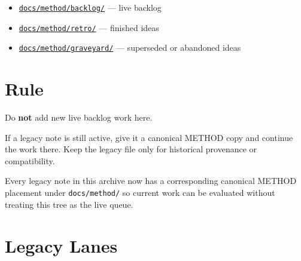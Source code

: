 \begin{itemize}
\tightlist
\item
  \href{https://github.com/flyingrobots/bijou/blob/cbd70612140e7a450d764b3c7be1c6af878b99bc/docs/method/graveyard/method/backlog/README.md}{\texttt{d\allowbreak{}o\allowbreak{}c\allowbreak{}s\allowbreak{}/\allowbreak{}m\allowbreak{}e\allowbreak{}t\allowbreak{}h\allowbreak{}o\allowbreak{}d\allowbreak{}/\allowbreak{}b\allowbreak{}a\allowbreak{}c\allowbreak{}k\allowbreak{}l\allowbreak{}o\allowbreak{}g\allowbreak{}/}} --- live backlog
\item
  \href{https://github.com/flyingrobots/bijou/blob/cbd70612140e7a450d764b3c7be1c6af878b99bc/docs/method/graveyard/method/retro/README.md}{\texttt{d\allowbreak{}o\allowbreak{}c\allowbreak{}s\allowbreak{}/\allowbreak{}m\allowbreak{}e\allowbreak{}t\allowbreak{}h\allowbreak{}o\allowbreak{}d\allowbreak{}/\allowbreak{}r\allowbreak{}e\allowbreak{}t\allowbreak{}r\allowbreak{}o\allowbreak{}/}} --- finished ideas
\item
  \href{https://github.com/flyingrobots/bijou/blob/cbd70612140e7a450d764b3c7be1c6af878b99bc/docs/method/graveyard/method/graveyard/README.md}{\texttt{d\allowbreak{}o\allowbreak{}c\allowbreak{}s\allowbreak{}/\allowbreak{}m\allowbreak{}e\allowbreak{}t\allowbreak{}h\allowbreak{}o\allowbreak{}d\allowbreak{}/\allowbreak{}g\allowbreak{}r\allowbreak{}a\allowbreak{}v\allowbreak{}e\allowbreak{}y\allowbreak{}a\allowbreak{}r\allowbreak{}d\allowbreak{}/}} --- superseded or abandoned ideas
\end{itemize}

\section{Rule}\label{record-386-rule}

Do \textbf{not} add new live backlog work here.

If a legacy note is still active, give it a canonical METHOD copy and continue the work there. Keep the legacy file only for historical provenance or compatibility.

Every legacy note in this archive now has a corresponding canonical METHOD placement under \texttt{d\allowbreak{}o\allowbreak{}c\allowbreak{}s\allowbreak{}/\allowbreak{}m\allowbreak{}e\allowbreak{}t\allowbreak{}h\allowbreak{}o\allowbreak{}d\allowbreak{}/} so current work can be evaluated without treating this tree as the live queue.

\section{Legacy Lanes}\label{record-386-legacy-lanes}

